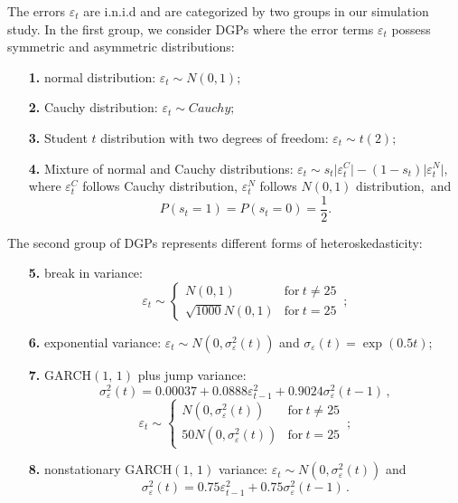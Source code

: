 \documentclass[harvard,11pt]{article}
\begin{document}
The errors $\varepsilon_t$ are i.n.i.d and are categorized by two groups in our simulation study. In the first group, we consider DGPs where the error terms $\varepsilon_t$ possess symmetric and asymmetric distributions:
\begin{enumerate}
\item[\textbf{1.}] normal distribution: $\varepsilon _{t}\sim N(0,1);$
\item[\textbf{2.}] Cauchy distribution: $\varepsilon _{t}\sim Cauchy;$
\item[\textbf{3.}] Student $t$ distribution with two degrees of freedom: $%
\varepsilon _{t}\sim t(2);$
\item[\textbf{4.}] Mixture of normal and Cauchy distributions: $%
\varepsilon _{t}\sim s_{t}\lvert \varepsilon _{t}^{C}\rvert-(1-s_{t})\lvert
\varepsilon _{t}^{N}\rvert ,$ where $\varepsilon _{t}^{C}$ follows Cauchy
distribution, $\varepsilon _{t}^{N}$ follows $N(0,1)$ distribution$,$ and 
\begin{equation*}
P\left( s_{t}=1\right) =P\left( s_{t}=0\right) =\frac{1}{2}%
.
\end{equation*}%
\end{enumerate}
The second group of DGPs represents different forms of heteroskedasticity:
\begin{enumerate}
\item[\textbf{5.}] break in variance: 
\begin{equation*}
\varepsilon _{t}\sim \left\{ 
\begin{array}{cc}
N(0,1) & \text{for}\ t\neq 25 \\ 
\sqrt{1000}N(0,1) & \text{for}\ t=25%
\end{array}%
\,;\right.
\end{equation*}%
\item[\textbf{6.}] exponential variance: $\varepsilon_{t}\sim N(0,\sigma_{\varepsilon }^{2}(t))$ and $\sigma _{\varepsilon}(t)=\exp(0.5t)$;
\item[\textbf{7.}] GARCH$(1,\,1)$ plus jump variance:%
\begin{equation*}
\sigma _{\varepsilon }^{2}(t)=0.00037+0.0888\varepsilon
_{t-1}^{2}+0.9024\sigma _{\varepsilon }^{2}(t-1)\,,
\end{equation*}%
\begin{equation*}
\varepsilon _{t}\sim \left\{ 
\begin{array}{cc}
N(0,\sigma _{\varepsilon }^{2}(t)) & \text{for}\ t\neq 25 \\ 
50N(0,\sigma _{\varepsilon }^{2}(t)) & \text{for}\ t=25%
\end{array}%
\right. \,;
\end{equation*}%
\item[\textbf{8.}] nonstationary GARCH$(1,\,1)$ variance: $\varepsilon
_{t}\sim N(0,\sigma _{\varepsilon }^{2}(t))$ and%
\begin{equation*}
\sigma _{\varepsilon }^{2}(t)=0.75\varepsilon _{t-1}^{2}+0.75\sigma
_{\varepsilon }^{2}(t-1)\,.
\end{equation*}%
\end{enumerate}
\end{document}
